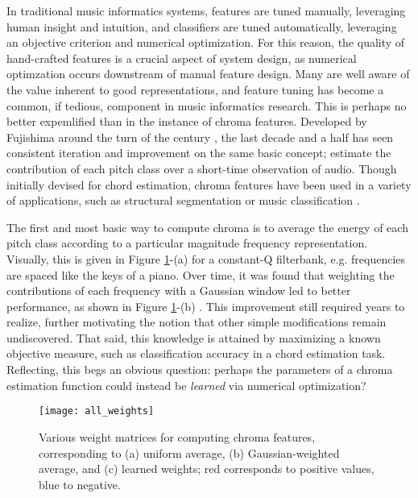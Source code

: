 In traditional music informatics systems, features are tuned manually, leveraging human insight and intuition, and classifiers are tuned automatically, leveraging an objective criterion and numerical optimization.
For this reason, the quality of hand-crafted features is a crucial aspect of system design, as numerical optimzation occurs downstream of manual feature design.
Many are well aware of the value inherent to good representations, and feature tuning has become a common, if tedious, component in music informatics research.
This is perhaps no better expemlified than in the instance of chroma features.
Developed by Fujishima around the turn of the century \cite{Fujishima1999}, the last decade and a half has seen consistent iteration and improvement on the same basic concept; estimate the contribution of each pitch class over a short-time observation of audio.
Though initially devised for chord estimation, chroma features have been used in a variety of applications, such as structural segmentation \cite{Levy2007} or music classification \cite{Mandel2005}.

The first and most basic way to compute chroma is to average the energy of each pitch class according to a particular magnitude frequency representation.
Visually, this is given in Figure \ref{fig:all_weights}-(a) for a constant-Q filterbank, e.g. frequencies are spaced like the keys of a piano.
Over time, it was found that weighting the contributions of each frequency with a Gaussian window led to better performance, as shown in Figure \ref{fig:all_weights}-(b) \cite{Cho2014}.
This improvement still required years to realize, further motivating the notion that other simple modifications remain undiscovered.
That said, this knowledge is attained by maximizing a known objective measure, such as classification accuracy in a chord estimation task.
Reflecting, this begs an obvious question: perhaps the parameters of a chroma estimation function could instead be \emph{learned} via numerical optimization?

\begin{figure}
\begin{centering}
\texttt{[image: all\_weights]}
\caption{Various weight matrices for computing chroma features, corresponding to (a) uniform average, (b) Gaussian-weighted average, and (c) learned weights; red corresponds to positive values, blue to negative.}
\label{fig:all_weights}
\end{centering}
\end{figure}

